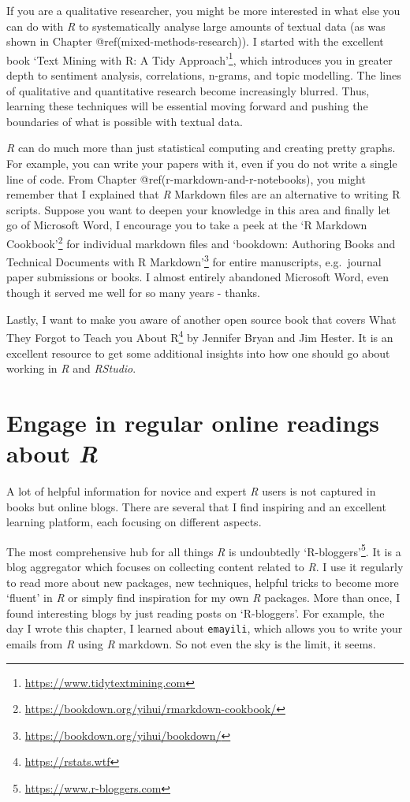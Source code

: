 \documentclass[
  letterpaper,
]{krantz}
\renewcommand{\href}[2]{#2\footnote{\url{#1}}}
\begin{document}
If you are a qualitative researcher, you might be more interested in
what else you can do with \emph{R} to systematically analyse large
amounts of textual data (as was shown in Chapter
@ref(mixed-methods-research)). I started with the excellent book
\href{https://www.tidytextmining.com}{`Text Mining with R: A Tidy
Approach'}, which introduces you in greater depth to sentiment analysis,
correlations, n-grams, and topic modelling. The lines of qualitative and
quantitative research become increasingly blurred. Thus, learning these
techniques will be essential moving forward and pushing the boundaries
of what is possible with textual data.

\emph{R} can do much more than just statistical computing and creating
pretty graphs. For example, you can write your papers with it, even if
you do not write a single line of code. From Chapter
@ref(r-markdown-and-r-notebooks), you might remember that I explained
that \emph{R} Markdown files are an alternative to writing R scripts.
Suppose you want to deepen your knowledge in this area and finally let
go of Microsoft Word, I encourage you to take a peek at the
\href{https://bookdown.org/yihui/rmarkdown-cookbook/}{`R Markdown
Cookbook'} for individual markdown files and
\href{https://bookdown.org/yihui/bookdown/}{`bookdown: Authoring Books
and Technical Documents with R Markdown'} for entire manuscripts,
e.g.~journal paper submissions or books. I almost entirely abandoned
Microsoft Word, even though it served me well for so many years -
thanks.

Lastly, I want to make you aware of another open source book that covers
\href{https://rstats.wtf}{What They Forgot to Teach you About R} by
Jennifer Bryan and Jim Hester. It is an excellent resource to get some
additional insights into how one should go about working in \emph{R} and
\emph{RStudio}.

\section{\texorpdfstring{Engage in regular online readings about
\emph{R}}{Engage in regular online readings about R}}\label{sec-next-steps-online-readings}

A lot of helpful information for novice and expert \emph{R} users is not
captured in books but online blogs. There are several that I find
inspiring and an excellent learning platform, each focusing on different
aspects.

The most comprehensive hub for all things \emph{R} is undoubtedly
\href{https://www.r-bloggers.com}{`R-bloggers'}. It is a blog aggregator
which focuses on collecting content related to \emph{R}. I use it
regularly to read more about new packages, new techniques, helpful
tricks to become more `fluent' in \emph{R} or simply find inspiration
for my own \emph{R} packages. More than once, I found interesting blogs
by just reading posts on `R-bloggers'. For example, the day I wrote this
chapter, I learned about \texttt{emayili}, which allows you to write
your emails from \emph{R} using \emph{R} markdown. So not even the sky
is the limit, it seems.
\end{document}

